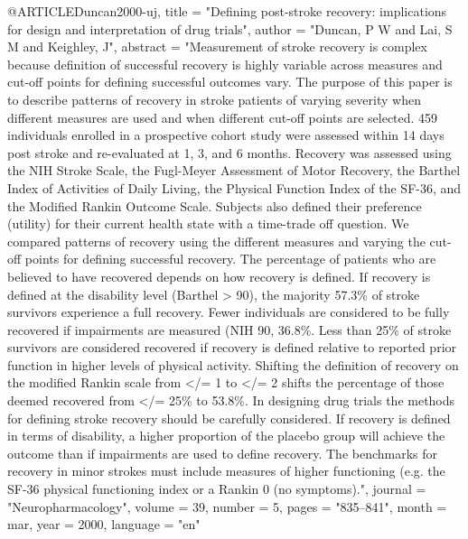 @ARTICLE{Duncan2000-uj,
	title    = "Defining post-stroke recovery: implications for design and
	interpretation of drug trials",
	author   = "Duncan, P W and Lai, S M and Keighley, J",
	abstract = "Measurement of stroke recovery is complex because definition of
	successful recovery is highly variable across measures and
	cut-off points for defining successful outcomes vary. The purpose
	of this paper is to describe patterns of recovery in stroke
	patients of varying severity when different measures are used and
	when different cut-off points are selected. 459 individuals
	enrolled in a prospective cohort study were assessed within 14
	days post stroke and re-evaluated at 1, 3, and 6 months. Recovery
	was assessed using the NIH Stroke Scale, the Fugl-Meyer
	Assessment of Motor Recovery, the Barthel Index of Activities of
	Daily Living, the Physical Function Index of the SF-36, and the
	Modified Rankin Outcome Scale. Subjects also defined their
	preference (utility) for their current health state with a
	time-trade off question. We compared patterns of recovery using
	the different measures and varying the cut-off points for
	defining successful recovery. The percentage of patients who are
	believed to have recovered depends on how recovery is defined. If
	recovery is defined at the disability level (Barthel > 90), the
	majority 57.3\% of stroke survivors experience a full recovery.
	Fewer individuals are considered to be fully recovered if
	impairments are measured (NIH 90, 36.8\%. Less than 25\% of
	stroke survivors are considered recovered if recovery is defined
	relative to reported prior function in higher levels of physical
	activity. Shifting the definition of recovery on the modified
	Rankin scale from </= 1 to </= 2 shifts the percentage of those
	deemed recovered from </= 25\% to 53.8\%. In designing drug
	trials the methods for defining stroke recovery should be
	carefully considered. If recovery is defined in terms of
	disability, a higher proportion of the placebo group will achieve
	the outcome than if impairments are used to define recovery. The
	benchmarks for recovery in minor strokes must include measures of
	higher functioning (e.g. the SF-36 physical functioning index or
	a Rankin 0 (no symptoms).",
	journal  = "Neuropharmacology",
	volume   =  39,
	number   =  5,
	pages    = "835--841",
	month    =  mar,
	year     =  2000,
	language = "en"
}

